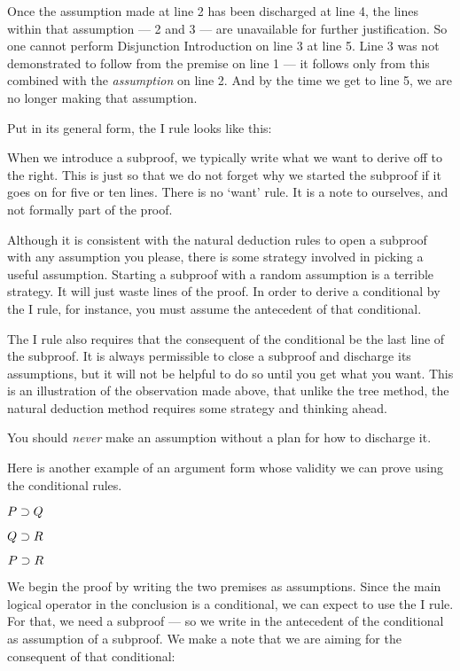 Once the assumption made at line 2 has been discharged at line 4, the lines within that assumption --- 2 and 3 --- are unavailable for further justification. So one cannot perform Disjunction Introduction on line 3 at line 5. Line 3 was not demonstrated to follow from the premise on line 1 --- it follows only from this combined with the \emph{assumption} on line 2. And by the time we get to line 5, we are no longer making that assumption.

Put in its general form, the {\eif}I rule looks like this:

\begin{ndproof}
	\open
		\metaA{} 
		\metaB{}
	\close
\end{ndproof}

When we introduce a subproof, we typically write what we want to derive off to the right. This is just so that we do not forget why we started the subproof if it goes on for five or ten lines. There is no `want' rule. It is a note to ourselves, and not formally part of the proof.

Although it is consistent with the natural deduction rules to open a subproof with any assumption you please, there is some strategy involved in picking a useful assumption. Starting a subproof with a random assumption is a terrible strategy. It will just waste lines of the proof. In order to derive a conditional by the {\eif}I rule, for instance, you must assume the antecedent of that conditional.

The {\eif}I rule also requires that the consequent of the conditional be the last line of the subproof. It is always permissible to close a subproof and discharge its assumptions, but it will not be helpful to do so until you get what you want. This is an illustration of the observation made above, that unlike the tree method, the natural deduction method requires some strategy and thinking ahead.

You should \emph{never} make an assumption without a plan for how to discharge it.

Here is another example of an argument form whose validity we can prove using the conditional rules.


\begin{earg}
\item[] $P \supset Q$
\item[] $Q \supset R$
\item[\therefore] $P \supset R$
\end{earg}
We begin the proof by writing the two premises as assumptions. Since the main logical operator in the conclusion is a conditional, we can expect to use the {\eif}I rule. For that, we need a subproof --- so we write in the antecedent of the conditional as assumption of a subproof. We make a note that we are aiming for the consequent of that conditional:

